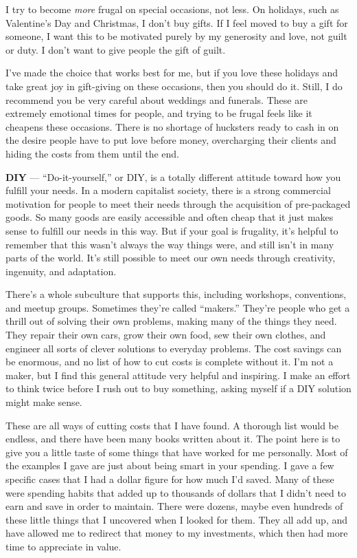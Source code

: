 I try to become \emph{more} frugal on special occasions, not less. On holidays, such as Valentine's Day and Christmas, I don't buy gifts. If I feel moved to buy a gift for someone, I want this to be motivated purely by my generosity and love, not guilt or duty. I don't want to give people the gift of guilt.

I've made the choice that works best for me, but if you love these holidays and take great joy in gift-giving on these occasions, then you should do it. Still, I do recommend you be very careful about weddings and funerals. These are extremely emotional times for people, and trying to be frugal feels like it cheapens these occasions. There is no shortage of hucksters ready to cash in on the desire people have to put love before money, overcharging their clients and hiding the costs from them until the end.

\textbf{DIY} --- ``Do-it-yourself,'' or DIY, is a totally different attitude toward how you fulfill your needs. In a modern capitalist society, there is a strong commercial motivation for people to meet their needs through the acquisition of pre-packaged goods. So many goods are easily accessible and often cheap that it just makes sense to fulfill our needs in this way. But if your goal is frugality, it's helpful to remember that this wasn't always the way things were, and still isn't in many parts of the world. It's still possible to meet our own needs through creativity, ingenuity, and adaptation.

There's a whole subculture that supports this, including workshops, conventions, and meetup groups. Sometimes they're called ``makers.'' They're people who get a thrill out of solving their own problems, making many of the things they need. They repair their own cars, grow their own food, sew their own clothes, and engineer all sorts of clever solutions to everyday problems. The cost savings can be enormous, and no list of how to cut costs is complete without it. I'm not a maker, but I find this general attitude very helpful and inspiring. I make an effort to think twice before I rush out to buy something, asking myself if a DIY solution might make sense.

These are all ways of cutting costs that I have found. A thorough list would be endless, and there have been many books written about it. The point here is to give you a little taste of some things that have worked for me personally. Most of the examples I gave are just about being smart in your spending. I gave a few specific cases that I had a dollar figure for how much I'd saved. Many of these were spending habits that added up to thousands of dollars that I didn't need to earn and save in order to maintain. There were dozens, maybe even hundreds of these little things that I uncovered when I looked for them. They all add up, and have allowed me to redirect that money to my investments, which then had more time to appreciate in value.

